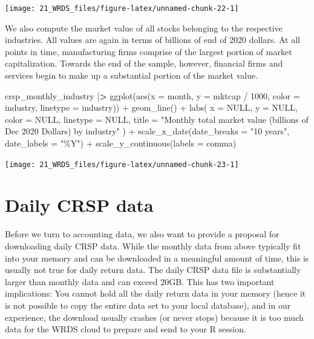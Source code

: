 \documentclass[
]{book}
\newenvironment{Shaded}{\begin{snugshade}}{\end{snugshade}}
\newcommand{\AttributeTok}[1]{\textcolor[rgb]{0.61,0.61,0.61}{#1}}
\newcommand{\ConstantTok}[1]{\textcolor[rgb]{0,0,0}{#1}}
\newcommand{\DecValTok}[1]{\textcolor[rgb]{0.06,0.06,0.06}{#1}}
\newcommand{\ErrorTok}[1]{\textcolor[rgb]{0.14,0.14,0.14}{\textbf{#1}}}
\newcommand{\FunctionTok}[1]{\textcolor[rgb]{0,0,0}{#1}}
\newcommand{\NormalTok}[1]{#1}
\newcommand{\SpecialCharTok}[1]{\textcolor[rgb]{0,0,0}{#1}}
\newcommand{\StringTok}[1]{\textcolor[rgb]{0.5,0.5,0.5}{#1}}
\begin{document}
\begin{center}\texttt{[image: 21\_WRDS\_files/figure-latex/unnamed-chunk-22-1]} \end{center}

We also compute the market value of all stocks belonging to the respective industries. All values are again in terms of billions of end of 2020 dollars. At all points in time, manufacturing firms comprise of the largest portion of market capitalization. Towards the end of the sample, however, financial firms and services begin to make up a substantial portion of the market value.

\begin{Shaded}
\begin{Highlighting}[]
\NormalTok{crsp\_monthly\_industry }\SpecialCharTok{|}\ErrorTok{\textgreater{}}
  \FunctionTok{ggplot}\NormalTok{(}\FunctionTok{aes}\NormalTok{(}\AttributeTok{x =}\NormalTok{ month, }
             \AttributeTok{y =}\NormalTok{ mktcap }\SpecialCharTok{/} \DecValTok{1000}\NormalTok{, }
             \AttributeTok{color =}\NormalTok{ industry, }
             \AttributeTok{linetype =}\NormalTok{ industry)) }\SpecialCharTok{+}
  \FunctionTok{geom\_line}\NormalTok{() }\SpecialCharTok{+}
  \FunctionTok{labs}\NormalTok{(}
    \AttributeTok{x =} \ConstantTok{NULL}\NormalTok{, }\AttributeTok{y =} \ConstantTok{NULL}\NormalTok{, }\AttributeTok{color =} \ConstantTok{NULL}\NormalTok{, }\AttributeTok{linetype =} \ConstantTok{NULL}\NormalTok{,}
    \AttributeTok{title =} \StringTok{"Monthly total market value (billions of Dec 2020 Dollars) by industry"}
\NormalTok{  ) }\SpecialCharTok{+}
  \FunctionTok{scale\_x\_date}\NormalTok{(}\AttributeTok{date\_breaks =} \StringTok{"10 years"}\NormalTok{, }\AttributeTok{date\_labels =} \StringTok{"\%Y"}\NormalTok{) }\SpecialCharTok{+}
  \FunctionTok{scale\_y\_continuous}\NormalTok{(}\AttributeTok{labels =}\NormalTok{ comma)}
\end{Highlighting}
\end{Shaded}

\begin{center}\texttt{[image: 21\_WRDS\_files/figure-latex/unnamed-chunk-23-1]} \end{center}

\hypertarget{daily-crsp-data}{%
\section{Daily CRSP data}\label{daily-crsp-data}}

Before we turn to accounting data, we also want to provide a proposal for downloading daily CRSP data. While the monthly data from above typically fit into your memory and can be downloaded in a meaningful amount of time, this is usually not true for daily return data. The daily CRSP data file is substantially larger than monthly data and can exceed 20GB. This has two important implications: You cannot hold all the daily return data in your memory (hence it is not possible to copy the entire data set to your local database), and in our experience, the download usually crashes (or never stops) because it is too much data for the WRDS cloud to prepare and send to your R session.
\end{document}
